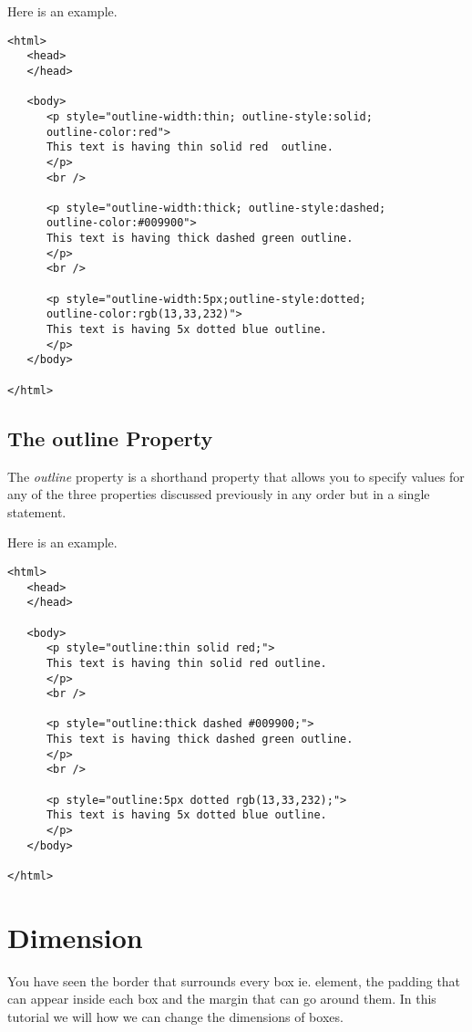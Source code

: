 \documentclass[a4paper,oneside]{book}
\numberwithin{equation}{chapter}
\begin{document}
Here is an example.
\begin{verbatim}
<html>
   <head>
   </head>
   
   <body>
      <p style="outline-width:thin; outline-style:solid;
      outline-color:red">
      This text is having thin solid red  outline.
      </p>
      <br />
      
      <p style="outline-width:thick; outline-style:dashed;
      outline-color:#009900">
      This text is having thick dashed green outline.
      </p>
      <br />
      
      <p style="outline-width:5px;outline-style:dotted;
      outline-color:rgb(13,33,232)">
      This text is having 5x dotted blue outline.
      </p>
   </body>
   
</html> 
\end{verbatim}
\subsection{The outline Property}
The \textit{outline} property is a shorthand property that allows you to specify values for any of the three properties discussed previously in any order but in a single statement.

Here is an example.
\begin{verbatim}
<html>
   <head>
   </head>
   
   <body>
      <p style="outline:thin solid red;">
      This text is having thin solid red outline.
      </p>
      <br />
       
      <p style="outline:thick dashed #009900;">
      This text is having thick dashed green outline.
      </p>
      <br />
      
      <p style="outline:5px dotted rgb(13,33,232);">
      This text is having 5x dotted blue outline.
      </p>
   </body>
   
</html> 
\end{verbatim}
\section{Dimension}
You have seen the border that surrounds every box ie. element, the padding that can appear inside each box and the margin that can go around them. In this tutorial we will how we can change the dimensions of boxes.
\end{document}
